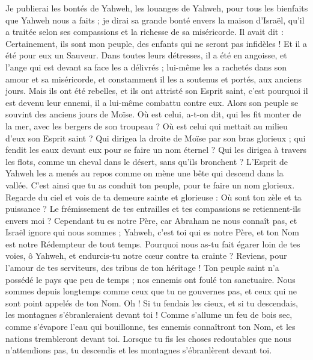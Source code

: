 \begin{multicols}{2}
Je publierai les bontés de Yahweh, les louanges de Yahweh, pour tous les bienfaits que Yahweh nous a faits ; je dirai sa grande bonté envers la maison d'Israël, qu'il a traitée selon ses compassions et la richesse de sa miséricorde.
Il avait dit : Certainement, ils sont mon peuple, des enfants qui ne seront pas infidèles ! Et il a été pour eux un Sauveur.
Dans toutes leurs détresses, il a été en angoisse, et l'ange qui est devant sa face les a délivrés ; lui-même les a rachetés dans son amour et sa miséricorde, et constamment il les a soutenus et portés, aux anciens jours.
Mais ils ont été rebelles, et ils ont attristé son Esprit saint, c'est pourquoi il est devenu leur ennemi, il a lui-même combattu contre eux.
Alors son peuple se souvint des anciens jours de Moïse. Où est celui, a-t-on dit, qui les fit monter de la mer, avec les bergers de son troupeau ? Où est celui qui mettait au milieu d'eux son Esprit saint ?
Qui dirigea la droite de Moïse par son bras glorieux ; qui fendit les eaux devant eux pour se faire un nom éternel ?
Qui les dirigea à travers les flots, comme un cheval dans le désert, sans qu'ils bronchent ?
L'Esprit de Yahweh les a menés au repos comme on mène une bête qui descend dans la vallée. C'est ainsi que tu as conduit ton peuple, pour te faire un nom glorieux.
Regarde du ciel et vois de ta demeure sainte et glorieuse : Où sont ton zèle et ta puissance ? Le frémissement de tes entrailles et tes compassions se retiennent-ils envers moi ?
Cependant tu es notre Père, car Abraham ne nous connaît pas, et Israël ignore qui nous sommes ; Yahweh, c'est toi qui es notre Père, et ton Nom est notre Rédempteur de tout temps.
Pourquoi nous as-tu fait égarer loin de tes voies, ô Yahweh, et endurcis-tu notre cœur contre ta crainte ? Reviens, pour l'amour de tes serviteurs, des tribus de ton héritage !
Ton peuple saint n'a possédé le pays que peu de temps ; nos ennemis ont foulé ton sanctuaire.
Nous sommes depuis longtemps comme ceux que tu ne gouvernes pas, et ceux qui ne sont point appelés de ton Nom. Oh ! Si tu fendais les cieux, et si tu descendais, les montagnes s'ébranleraient devant toi !
\VerseOne{}Comme s'allume un feu de bois sec, comme s'évapore l'eau qui bouillonne, tes ennemis connaîtront ton Nom, et les nations trembleront devant toi.
Lorsque tu fis les choses redoutables que nous n'attendions pas, tu descendis et les montagnes s'ébranlèrent devant toi.

\end{multicols}
